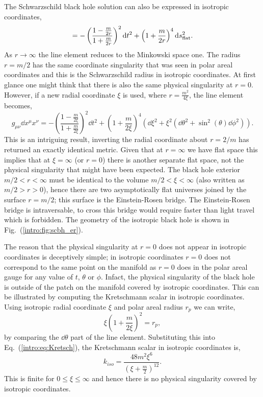 The Schwarzschild black hole solution can also be expressed in isotropic coordinates,
\begin{align} \label{intro:eq:iso_bh}
= -\left(\frac{1-\frac{m}{2r}}{1+\frac{m}{2r}} \right)^2 \dd t^2 + \left(1+\frac{m}{2r} \right)^4 \dd s_{\rm flat}^2.
\end{align}
As $r \rightarrow \infty$ the line element reduces to the Minkowski space one. The radius $r= m/2$ has the same coordinate singularity that was seen in polar areal coordinates and this is the Schwarzschild radius in isotropic coordinates. At first glance one might think that there is also the same physical singularity at $r=0$. However, if a new radial coordinate $\xi$ is used, where $r = \frac{m^2}{4\xi}$, the line element becomes, 
\begin{equation}
g_{\mu\nu} \dd x^\mu x^\nu = -\left(\frac{1-\frac{m}{2\xi}}{1+\frac{m}{2\xi}} \right)^2 \dd t^2 + \left(1+\frac{m}{2\xi} \right)^4 \left(\dd \xi^2 + \xi^2(\dd \theta^2 + \sin^2 (\theta) \dd \phi^2) \right).
\end{equation}
This is an intriguing result, inverting the radial coordinate about $r=2/m$ has returned an exactly identical metric. Given that at $r=\infty$ we have flat space this implies that at $\xi=\infty$ (or $r=0$) there is another separate flat space, not the physical singularity that might have been expected. The black hole exterior $m/2<r<\infty$ must be identical to the volume $m/2<\xi<\infty$ (also written as $m/2>r>0$), hence there are two asymptotically flat universes joined by the surface $r=m/2$; this surface is the Einstein-Rosen bridge. The Einstein-Rosen bridge is intraversable, to cross this bridge would require faster than light travel which is forbidden. The geometry of the isotropic black hole is shown in Fig.~(\ref{intro:fig:scbh_er}).


The reason that the physical singularity at $r=0$ does not appear in isotropic coordinates is deceptively simple; in isotropic coordinates $r=0$ does not correspond to the same point on the manifold as $r=0$ does in the polar areal gauge for any value of $t$, $\theta$ or $\phi$. Infact, the physical singularity of the black hole is outside of the patch on the manifold covered by isotropic coordinates. This can be illustrated by computing the Kretschmann scalar in isotropic coordinates. Using isotropic radial coordinate $\xi$ and polar areal radius $r_p$ we can write,
\begin{equation}
\xi \left(1 +\frac{m}{2\xi} \right)^2 = r_p,
\end{equation}
by comparing the $\dd\theta$ part of the line element. Substituting this into Eq.~(\ref{intro:eq:Kretsch}), the Kretschmann scalar in isotropic coordinates is,
\begin{equation}
k_{iso} =  \frac{48 m^2\xi^6}{\left(\xi + \frac{m}{2} \right)^{12}}.
\end{equation}
This is finite for $0\leq \xi \leq \infty$ and hence there is no physical singularity covered by isotropic coordinates.

